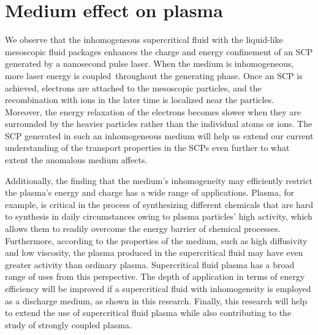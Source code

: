 \section{Medium effect on plasma}
\label{sec:ch4-5}

We observe that the inhomogeneous supercritical fluid with the liquid-like mesoscopic fluid packages enhances the charge and energy confinement of an SCP generated by a nanosecond pulse laser. When the medium is inhomogeneous, more laser energy is coupled throughout the generating phase. Once an SCP is achieved, electrons are attached to the mesoscopic particles, and the recombination with ions in the later time is localized near the particles. Moreover, the energy relaxation of the electrons becomes slower when they are surrounded by the heavier particles rather than the individual atoms or ions. The SCP generated in such an inhomogeneous medium will help us extend our current understanding of the transport properties in the SCPs even further to what extent the anomalous medium affects.

Additionally, the finding that the medium's inhomogeneity may efficiently restrict the plasma's energy and charge has a wide range of applications. Plasma, for example, is critical in the process of synthesizing different chemicals that are hard to synthesis in daily circumstances owing to plasma particles' high activity, which allows them to readily overcome the energy barrier of chemical processes. Furthermore, according to the properties of the medium, such as high diffusivity and low viscosity, the plasma produced in the supercritical fluid may have even greater activity than ordinary plasma. Supercritical fluid plasma has a broad range of uses from this perspective. The depth of application in terms of energy efficiency will be improved if a supercritical fluid with inhomogeneity is employed as a discharge medium, as shown in this research. Finally, this research will help to extend the use of supercritical fluid plasma while also contributing to the study of strongly coupled plasma.


